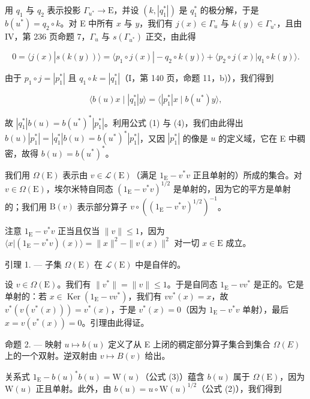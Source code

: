 用 \(q_{1}\) 与 \(q_{2}\) 表示投影 \(\Gamma_{u^{*}}\to\mathrm{E}\)，并设 \((k,|q_{1}^{*}|)\) 是 \(q_{1}^{*}\) 的极分解，于是 \(b(u^{*})=q_{2}\circ k\)。对 E 中所有 \(x\) 与 \(y\)，我们有 \(j(x)\in\Gamma_{u}\) 与 \(k(y)\in\Gamma_{u^{*}}\)，且由 IV，第 236 页命题 7，\(\Gamma_{u}\) 与 \(s(\Gamma_{u^{*}})\) 正交，由此得

\[
0 = \langle j (x) | s (k (y)) \rangle = \langle p _ {1} \circ j (x) | - q _ {2} \circ k (y) \rangle + \langle p _ {2} \circ j (x) | q _ {1} \circ k (y) \rangle .
\]

由于 \(p_1 \circ j = |p_1^*|\) 且 \(q_1 \circ k = |q_1^*|\)（I，第 140 页，命题 11，b)），我们得到

\[
\langle b (u) x \mid | q _ {1} ^ {*} | y \rangle = \langle | p _ {1} ^ {*} | x \mid b (u ^ {*}) y \rangle ,
\]

故 \(|q_1^*|b(u) = b(u^*)^* |p_1^*|\)。利用公式 (1) 与 (4)，我们由此得出 \(b(u)|p_1^*| = |q_1^*|b(u) = b(u^*)^* |p_1^*|\)，又因 \(|p_1^*|\) 的像是 \(u\) 的定义域，它在 E 中稠密，故得 \(b(u) = b(u^*)^*\)。

我们用 \(\Omega(\mathrm{E})\) 表示由 \(v \in \mathcal{L}(\mathrm{E})\)（满足 \(1_{\mathrm{E}} - v^{*}v\) 正且单射的）所成的集合。对 \(v \in \Omega(\mathrm{E})\)，埃尔米特自同态 \((1_{\mathrm{E}} - v^{*}v)^{1/2}\) 是单射的，因为它的平方是单射的；我们用 \(\mathrm{B}(v)\) 表示部分算子 \(v \circ ((1_{\mathrm{E}} - v^{*}v)^{1/2})^{-1}\)。

注意 \(1_{\mathrm{E}} - v^{*}v\) 正当且仅当 \(\| v\| \leqslant 1\)，因为 \(\langle x|(1_{\mathrm{E}} - v^{*}v)(x)\rangle = \| x\| ^2 -\| v(x)\| ^2\) 对一切 \(x\in \mathrm{E}\) 成立。

引理 1. --- 子集 \(\Omega(\mathrm{E})\) 在 \(\mathcal{L}(\mathrm{E})\) 中是自伴的。

设 \(v \in \Omega(\mathrm{E})\)。我们有 \(\|v^{*}\| = \|v\| \leqslant 1\)。于是自同态 \(1_{\mathrm{E}} - vv^{*}\) 是正的。它是单射的：若 \(x \in \operatorname{Ker}(1_{\mathrm{E}} - vv^{*})\)，我们有 \(vv^{*}(x) = x\)，故 \(v^{*}(v(v^{*}(x))) = v^{*}(x)\)，于是 \(v^{*}(x) = 0\)（因为 \(1_{\mathrm{E}} - v^{*}v\) 单射），最后 \(x = v(v^{*}(x)) = 0\)。引理由此得证。

命题 2. — 映射 \(u \mapsto b(u)\) 定义了从 E 上闭的稠定部分算子集合到集合 \(\Omega(E)\) 上的一个双射。逆双射由 \(v \mapsto B(v)\) 给出。

关系式 \(1_{\mathrm{E}} - b(u)^{*}b(u) = \mathrm{W}(u)\)（公式 (3)）蕴含 \(b(u)\) 属于 \(\Omega (\mathrm{E})\)，因为 \(\mathrm{W}(u)\) 正且单射。此外，由 \(b(u) = u\circ \mathrm{W}(u)^{1 / 2}\)（公式 (2)），我们得到

